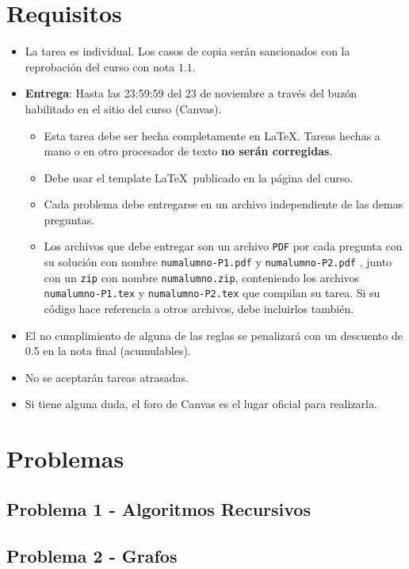 \documentclass[12pt]{article}
\begin{document}
\section*{Requisitos}
\begin{itemize}

  \item La tarea es individual. Los casos de copia serán sancionados con la
   reprobación del curso con nota $1.1$.

  \item \textbf{Entrega}: Hasta las 23:59:59 del 23 de noviembre a través del buzón habilitado en el sitio del curso (Canvas).

  \begin{itemize}

    \item Esta tarea debe ser hecha completamente en \LaTeX. Tareas hechas a mano o
    en otro procesador de texto \textbf{no serán corregidas}.

    \item Debe usar el template \LaTeX\ publicado en la página del curso.

    \item Cada problema debe entregarse en un archivo independiente de las demas preguntas.

    \item Los archivos que debe entregar son un archivo \texttt{PDF} por cada pregunta
    con su solución con nombre \texttt{numalumno-P1.pdf} y \texttt{numalumno-P2.pdf} ,
    junto con un \texttt{zip} con nombre \texttt{numalumno.zip}, conteniendo los archivos \texttt{numalumno-P1.tex} y \texttt{numalumno-P2.tex} que compilan su tarea.
    Si su código hace referencia a otros archivos, debe incluirlos también.

  \end{itemize}

  \item El no cumplimiento de alguna de las reglas se penalizará con un descuento de 0.5 en la nota final (acumulables).

  \item No se aceptarán tareas atrasadas.

  \item Si tiene alguna duda, el foro de Canvas es el lugar oficial para realizarla.
\end{itemize}


\newpage
\section*{Problemas}

    \subsection*{Problema 1 - Algoritmos Recursivos}
      
     \newpage
     \subsection*{Problema 2 - Grafos}
      
\end{document}
